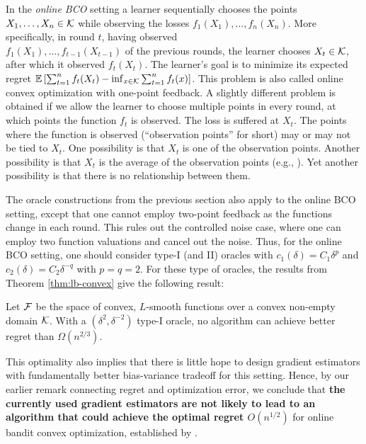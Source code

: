 In the \emph{online BCO} setting a learner sequentially chooses the points $X_1,\dots,X_n\in \mathcal{K}$ while observing the losses $f_1(X_1),\dots,f_n(X_n)$. More specifically, in round $t$, having observed\\ $f_1(X_1),\dots,f_{t-1}(X_{t-1})$ of the previous rounds, the learner chooses $X_t\in \mathcal{K}$, after which it observed $f_t(X_t)$. The learner's goal is to minimize its expected regret $\mathbb{E}\left[ \sum_{t=1}^n f_t(X_t) - \inf_{x\in \mathcal{K}} \sum_{t=1}^n f_t(x) \right]$. 
This problem is also called online convex optimization with one-point feedback.
A slightly different problem is obtained if we allow the learner to choose multiple points in every round, at which points the function $f_t$ is observed. The loss is suffered at $X_t$. The points where the function is observed (``observation points'' for short) may or may not be tied to $X_t$. One possibility is that $X_t$ is one of the observation points.  
Another possibility is that $X_t$ is the average of the observation points (e.g., \citealt{AgDeXi10}). Yet another possibility is that there is no relationship between them. 

The oracle constructions from the previous section also apply to the online BCO setting, except that one cannot employ two-point feedback as the functions change in each round.  
This rules out the controlled noise case, where one can employ two function valuations and cancel out the noise. Thus, for the online BCO setting, one should consider type-I (and II) oracles with $c_1(\delta) = C_1 \delta^p$ and $c_2(\delta) = C_2\delta^{-q}$ with $p=q=2$.
For these type of oracles, the results from Theorem \ref{thm:lb-convex} give the following result: 
\begin{theorem}\label{thm:aaa}
Let $\mathcal{F}$ be the space of convex, $L$-smooth functions over a convex non-empty domain $\mathcal{K}$.
With a 
$(\delta^2,\delta^{-2})$ type-I oracle, no algorithm can achieve better regret than $\Omega(n^{2/3})$.
\end{theorem}

This optimality also implies that there is little hope to design gradient estimators with fundamentally better bias-variance tradeoff for this setting. Hence, by our earlier remark connecting regret and optimization error, we conclude that
 \textbf{
the currently used gradient estimators are not likely to lead to an algorithm that could  achieve the optimal
regret $O(n^{1/2})$} for online bandit convex optimization, established by \citet{BubeckDKP15,BuEl15}.

